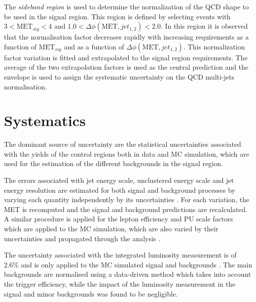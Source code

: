 The \textit{sideband region} is used to determine the normalization of the \gls{QCD} shape to be used in the signal region. This region is defined by selecting events with $3<\text{MET}_{sig}<4$ and $1.0<\Delta\phi(\text{MET},jet_{1,2})<2.0$. In this region it is observed that the normalisation factor decreases rapidly with increasing requirements as a function of $\text{MET}_{sig}$ and as a function of $\Delta\phi(\text{MET},jet_{1,2})$. This normalization factor variation is fitted and extrapolated to the signal region requirements. The average of the two extrapolation factors is used as the central prediction and the envelope is used to assign the systematic uncertainty on the \gls{QCD} multi-jets normalisation.

\section{Systematics}


The dominant source of uncertainty are the statistical uncertainties associated with the yields of the control regions both in data and \gls{MC} simulation, which are used for the estimation of the different backgrounds in the signal region. 

The errors associated with jet energy scale, unclustered energy scale and jet energy resolution are estimated for both signal and background processes by varying each quantity independently by its uncertainties \cite{ARTICLE:CMSDeterminationJetEnergyCalibration}. For each variation, the \gls{MET} is recomputed and the signal and background predictions are recalculated. A similar procedure is applied for the lepton efficiency and \gls{PU} scale factors which are applied to the \gls{MC} simulation, which are also varied by their uncertainties and propagated through the analysis \cite{ARTICLE:CMSMuonReconstruction7TeV,ARTICLE:CMSElectronReconstruction8TeV}.

The uncertainty associated with the integrated luminosity measurement is of 2.6\% and is only applied to the \gls{MC} simulated signal and backgrounds \cite{ARTICLE:CMSLuminosityBasedonPixelClusterCounting}. The main backgrounds are normalised using a data-driven method which takes into account the trigger efficiency, while the impact of the luminosity measurement in the signal and minor backgrounds was found to be negligible.

